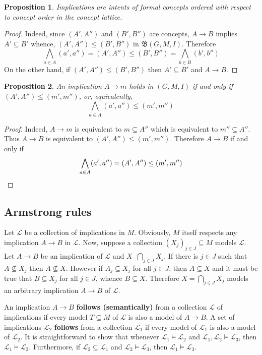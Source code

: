 \documentclass[a4paper]{article}
\newcommand{\brac}[1]{{\left ( #1 \right )}}
\newcommand{\Lcal}{\mathcal{L}}
\newcommand{\cltc}{\mathfrak{B}}
\newtheorem{prop}{Proposition}
\newcommand{\defn}{\mathop{\overset{\Delta}{=}}\nolimits}
\begin{document}
\begin{prop} Implications are intents of formal concepts ordered with respect to concept order in the concept lattice.
\end{prop}

\begin{proof}
Indeed, since $(A',A'')$ and $(B',B'')$ are concepts, $A\to B$ implies $A'\subseteq B'$ whence, $(A',A'')\leq (B',B'')$ in $\cltc(G,M,I)$. Therefore \[\bigwedge_{a\in A} (a', a'') = (A',A'') \leq (B', B'') = \bigwedge_{b\in B} (b', b'')\] On the other hand, if $(A',A'')\leq (B',B'')$ then $A'\subseteq B'$ and $A\to B$.
\end{proof}

\begin{prop} An implication $A\to m$ holds in $(G,M,I)$ if and only if $(A', A'')\leq (m', m'')$, or, equivalently, \[\bigwedge_{a\in A} (a', a'')\leq (m', m'')\]
\end{prop}

\begin{proof}
Indeed, $A\to m$ is equivalent to $m\subseteq A''$ which is equivalent to $m''\subseteq A''$. Thus $A\to B$ is equivalent to $(A', A'')\leq (m', m'')$. Therefore $A\to B$ if and only if \[\bigwedge_{a\in A} (a', a'') = (A', A'')\leq (m', m'') \qedhere\]
\end{proof}

\subsection{Armstrong rules} %
\label{sub:armstrong_rules}

Let $\Lcal$ be a collection of implications in $M$. Obviously, $M$ itself respects any implication $A\to B$ in $\Lcal$. Now, suppose a collection $\brac{X_j}_{j\in J}\subseteq M$ models $\Lcal$. Let $A\to B$ be an implication of $\Lcal$ and $X\defn \bigcap_{j\in J} X_j$. If there is $j\in J$ such that $A\not\subseteq X_j$ then $A\not\subseteq X$. However if $A_j\subseteq X_j$ for all $j\in J$, then $A\subseteq X$ and it must be true that $B\subseteq X_j$ for all $j\in J$, whence $B\subseteq X$. Therefore $X = \bigcap_{j\in J} X_j$ models an arbitrary implication $A\to B$ of $\Lcal$.

An implication $A\to B$ \textbf{follows (semantically)} from a collection $\Lcal$ of implications if every model $T\subseteq M$ of $\Lcal$ is also a model of $A\to B$. A set of implications $\Lcal_2$ \textbf{follows} from a collection $\Lcal_1$ if every model of $\Lcal_1$ is also a model of $\Lcal_2$. It is straightforward to show that whenever $\Lcal_1\models\Lcal_2$ and $\Lcal_1,\Lcal_2\models \Lcal_3$, then $\Lcal_1\models\Lcal_3$. Furthermore, if $\Lcal_2\subseteq \Lcal_1$ and $\Lcal_2\models \Lcal_3$, then $\Lcal_1\models \Lcal_3$.
\end{document}
